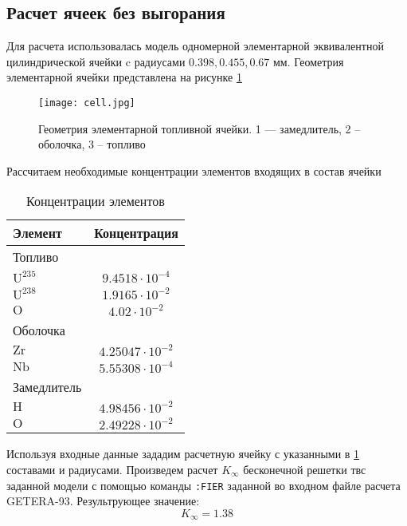 \subsection{Расчет ячеек без выгорания}
Для расчета использовалась модель одномерной элементарной эквивалентной цилиндрической ячейки c радиусами $0.398, 0.455, 0.67$ мм. Геометрия элементарной ячейки представлена на рисунке \ref{pic:neutron_cell}

\begin{figure}[H]
	\begin{center}
		\texttt{[image: cell.jpg]}
		\caption{Геометрия элементарной топливной ячейки. 1 — замедлитель, 2 – оболочка, 3 – топливо}
		\label{pic:neutron_cell} %
	\end{center}
\end{figure}
Рассчитаем необходимые концентрации элементов входящих в состав ячейки

\begin{table}[H]
	\caption{Концентрации элементов}
	\begin{center}
        \begin{tabular}{|l|c|}
        \toprule
         Элемент & Концентрация\\ 
         \midrule
          Топливо & \\
         \hline
          $\text{U}^{235}$ & $9.4518 \cdot 10^{-4}$\\
         \hline
          $\text{U}^{238}$ & $1.9165\cdot 10^{-2}$\\
         \hline
          $\text{O}$ & $4.02 \cdot 10^{-2}$\\
         \hline
         Оболочка & \\
         \hline
          $\text{Zr}$ & $4.25047 \cdot 10^{-2}$\\
         \hline
          $\text{Nb}$ & $5.55308\cdot 10^{-4}$\\
         \hline
         Замедлитель & \\
         \hline
         $\text{H}$ & $4.98456\cdot 10^{-2}$\\
         \hline
         $\text{O}$ & $2.49228\cdot 10^{-2}$\\
         \bottomrule
		\end{tabular}
		\label{tabular:neutron_conc}
	\end{center}
\end{table}
Используя входные данные зададим расчетную ячейку с указанными в \ref{tabular:neutron_conc} составами и радиусами.
Произведем расчет $K_{\infty}$ бесконечной решетки твс заданной модели с помощью команды \texttt{:FIER} заданной во входном файле расчета GETERA-93. Результрующее значение:
$$
K_{\infty} = 1.38
$$
